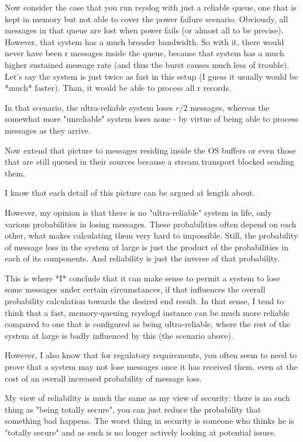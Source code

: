 \documentclass[a4paper,10pt]{article}
\begin{document}
Now consider the case that you run rsyslog with just a reliable queue, one that is kept in memory but not able to cover the power failure scenario. Obviously, all messages in that queue are lost when power fails (or almost all to be precise). However, that system has a much broader bandwidth. So with it, there would never have been r messages inside the queue, because that system has a much higher sustained message rate (and thus the burst causes much less of trouble). Let's say the system is just twice as fast in this setup (I guess it usually would be *much* faster). Than, it would be able to process all r records.

In that scenario, the ultra-reliable system loses $r/2$ messages, whereas the somewhat more "unreliable" system loses none - by virtue of being able to process messages as they arrive. 

Now extend that picture to messages residing inside the OS buffers or even those that are still queued in their sources because a stream transport blocked sending them.

I know that each detail of this picture can be argued at length about.

However, my opinion is that there is no "ultra-reliable" system in life, only various probabilities in losing messages. These probabilities  often depend on each other, what makes calculating them very hard to impossible. Still, the probability of message loss in the system at large is just the product of the probabilities in each of its  components. And reliability is just the inverse of that probability.

This is where *I* conclude that it can make sense to permit a system to lose some messages under certain circumstances, if that influences the overall probability calculation towards the desired end result. In that sense, I tend to think that a fast, memory-queuing rsyslogd instance can be much more reliable compared to one that is configured as being ultra-reliable, where the rest of the system at large is badly influenced by this (the scenario above).

However, I also know that for regulatory requirements, you often seem to need to prove that a system may not lose messages once it has received them, even at the cost of an overall increased probability of message loss.

My view of reliability is much the same as my view of security: there is no such thing as "being totally secure", you can just reduce the probability that something bad happens. The worst thing in security is someone who thinks he is "totally secure" and as such is no longer actively looking at potential issues.
\end{document}
